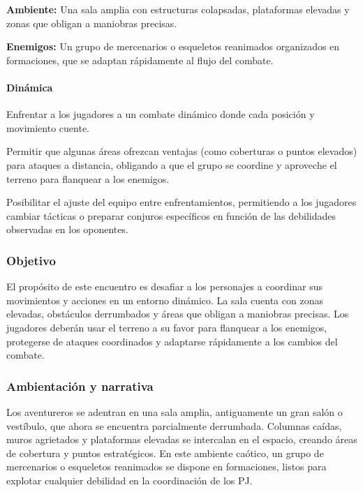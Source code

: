 \documentclass[
  twocolumn]{article}
\begin{document}
\textbf{Ambiente:} Una sala amplia con estructuras colapsadas,
plataformas elevadas y zonas que obligan a maniobras precisas.

\textbf{Enemigos:} Un grupo de mercenarios o esqueletos reanimados
organizados en formaciones, que se adaptan rápidamente al flujo del
combate.

\paragraph{\texorpdfstring{\textbf{Dinámica}}{Dinámica}}\label{dinuxe1mica}

Enfrentar a los jugadores a un combate dinámico donde cada posición y
movimiento cuente.

Permitir que algunas áreas ofrezcan ventajas (como coberturas o puntos
elevados) para ataques a distancia, obligando a que el grupo se coordine
y aproveche el terreno para flanquear a los enemigos.

Posibilitar el ajuste del equipo entre enfrentamientos, permitiendo a
los jugadores cambiar tácticas o preparar conjuros específicos en
función de las debilidades observadas en los oponentes.

\subsubsection{Objetivo}\label{objetivo-3}

El propósito de este encuentro es desafiar a los personajes a coordinar
sus movimientos y acciones en un entorno dinámico. La sala cuenta con
zonas elevadas, obstáculos derrumbados y áreas que obligan a maniobras
precisas. Los jugadores deberán usar el terreno a su favor para
flanquear a los enemigos, protegerse de ataques coordinados y adaptarse
rápidamente a los cambios del combate.

\subsubsection{Ambientación y
narrativa}\label{ambientaciuxf3n-y-narrativa-3}

Los aventureros se adentran en una sala amplia, antiguamente un gran
salón o vestíbulo, que ahora se encuentra parcialmente derrumbada.
Columnas caídas, muros agrietados y plataformas elevadas se intercalan
en el espacio, creando áreas de cobertura y puntos estratégicos. En este
ambiente caótico, un grupo de mercenarios o esqueletos reanimados se
dispone en formaciones, listos para explotar cualquier debilidad en la
coordinación de los PJ.
\end{document}
